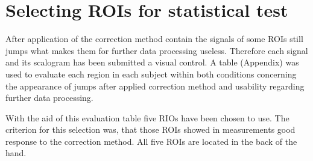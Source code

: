 \section{Selecting ROIs for statistical test}

After application of the correction method contain the signals of some ROIs still jumps what makes them for further data processing useless. Therefore each signal and its scalogram has been submitted a visual control. A table (Appendix) was used to evaluate each region in each subject within both conditions concerning the appearance of jumps after applied correction method and usability regarding further data processing.

With the aid of this evaluation table five RIOs have been chosen to use. The criterion for this selection was, that those ROIs showed in measurements good response to the correction method. All five ROIs are located in the back of the hand.